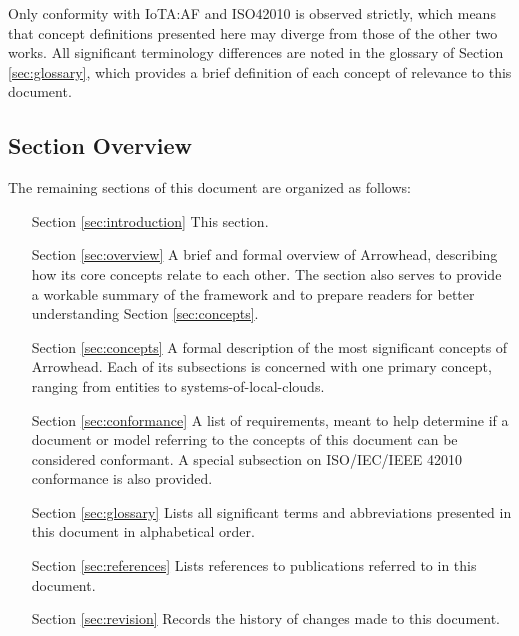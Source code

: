 Only conformity with IoTA:AF and ISO42010 is observed strictly, which means that concept definitions presented here may diverge from those of the other two works.
All significant terminology differences are noted in the glossary of Section \ref{sec:glossary}, which provides a brief definition of each concept of relevance to this document.

\subsection{Section Overview}
\label{sec:introduction:sections}

The remaining sections of this document are organized as follows:
\vspace*{2mm}
\begin{itemize}[leftmargin=2cm,rightmargin=0pt,labelwidth=2cm,labelsep=0pt,itemindent=0pt,parsep=0.1cm,topsep=0.1cm,align=left]

\item[Section \ref{sec:introduction}]
This section.

\item[Section \ref{sec:overview}]
A brief and formal overview of Arrowhead, describing how its core concepts relate to each other.
The section also serves to provide a workable summary of the framework and to prepare readers for better understanding Section \ref{sec:concepts}.

\item[Section \ref{sec:concepts}]
A formal description of the most significant concepts of Arrowhead.
Each of its subsections is concerned with one primary concept, ranging from entities to systems-of-local-clouds.

\item[Section \ref{sec:conformance}]
A list of requirements, meant to help determine if a document or model referring to the concepts of this document can be considered conformant.
A special subsection on ISO/IEC/IEEE 42010 conformance is also provided.

\item[Section \ref{sec:glossary}]
Lists all significant terms and abbreviations presented in this document in alphabetical order.

\item[Section \ref{sec:references}]
Lists references to publications referred to in this document.

\item[Section \ref{sec:revision}]
Records the history of changes made to this document.

\end{itemize}
